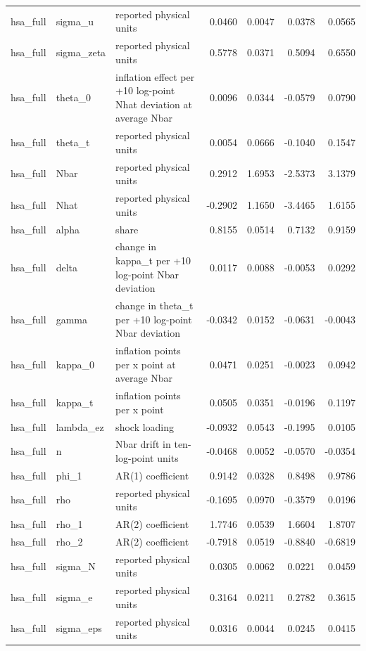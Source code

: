 \begin{tabular}{lllrrrr}
hsa\_full & sigma\_u & reported physical units & 0.0460 & 0.0047 & 0.0378 & 0.0565 \\
hsa\_full & sigma\_zeta & reported physical units & 0.5778 & 0.0371 & 0.5094 & 0.6550 \\
hsa\_full & theta\_0 & inflation effect per +10 log-point Nhat deviation at average Nbar & 0.0096 & 0.0344 & -0.0579 & 0.0790 \\
hsa\_full & theta\_t & reported physical units & 0.0054 & 0.0666 & -0.1040 & 0.1547 \\
hsa\_full & Nbar & reported physical units & 0.2912 & 1.6953 & -2.5373 & 3.1379 \\
hsa\_full & Nhat & reported physical units & -0.2902 & 1.1650 & -3.4465 & 1.6155 \\
hsa\_full & alpha & share & 0.8155 & 0.0514 & 0.7132 & 0.9159 \\
hsa\_full & delta & change in kappa\_t per +10 log-point Nbar deviation & 0.0117 & 0.0088 & -0.0053 & 0.0292 \\
hsa\_full & gamma & change in theta\_t per +10 log-point Nbar deviation & -0.0342 & 0.0152 & -0.0631 & -0.0043 \\
hsa\_full & kappa\_0 & inflation points per x point at average Nbar & 0.0471 & 0.0251 & -0.0023 & 0.0942 \\
hsa\_full & kappa\_t & inflation points per x point & 0.0505 & 0.0351 & -0.0196 & 0.1197 \\
hsa\_full & lambda\_ez & shock loading & -0.0932 & 0.0543 & -0.1995 & 0.0105 \\
hsa\_full & n & Nbar drift in ten-log-point units & -0.0468 & 0.0052 & -0.0570 & -0.0354 \\
hsa\_full & phi\_1 & AR(1) coefficient & 0.9142 & 0.0328 & 0.8498 & 0.9786 \\
hsa\_full & rho & reported physical units & -0.1695 & 0.0970 & -0.3579 & 0.0196 \\
hsa\_full & rho\_1 & AR(2) coefficient & 1.7746 & 0.0539 & 1.6604 & 1.8707 \\
hsa\_full & rho\_2 & AR(2) coefficient & -0.7918 & 0.0519 & -0.8840 & -0.6819 \\
hsa\_full & sigma\_N & reported physical units & 0.0305 & 0.0062 & 0.0221 & 0.0459 \\
hsa\_full & sigma\_e & reported physical units & 0.3164 & 0.0211 & 0.2782 & 0.3615 \\
hsa\_full & sigma\_eps & reported physical units & 0.0316 & 0.0044 & 0.0245 & 0.0415 \\

\end{tabular}
